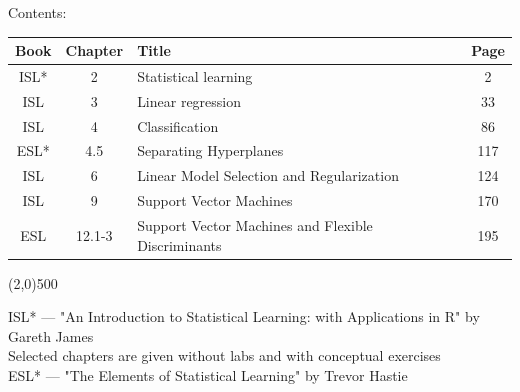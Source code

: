 \documentclass[a4paper,12pt,titlepage]{article} %
\begin{document}
\begin{titlepage}
\vspace{40pt}

\begin{center}
	{\large Contents:}
\end{center}
\begin{tabularx}{\textwidth}{|c|c|X|c|}
	\hline
	Book & Chapter & Title & Page \\
	\hline
	ISL* & 2 & Statistical learning & 2 \\
	\hline
	ISL & 3 & Linear regression & 33 \\
	\hline
	ISL & 4 & Classification & 86 \\
	\hline
	ESL* & 4.5 & Separating Hyperplanes & 117 \\
	\hline
	ISL & 6 & Linear Model Selection and Regularization & 124 \\
	\hline
	ISL & 9 & Support Vector Machines & 170 \\
	\hline
	ESL & 12.1-3 & Support Vector Machines and Flexible Discriminants & 195 \\
	\hline
\end{tabularx}

\vspace{\fill}
\begin{center}
	\line(2,0){500}
\end{center}

{\small ISL* --- "An Introduction to Statistical Learning: with Applications in R" by Gareth James\\
Selected chapters are given without labs and with conceptual exercises\\

ESL* --- "The Elements of Statistical Learning" by Trevor Hastie}

\end{titlepage}

\end{document}
